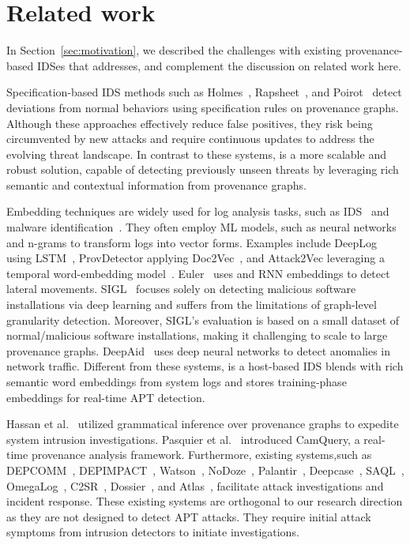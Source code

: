 \section{Related work}
\label{s:relwk}
In Section~\ref{sec:motivation}, we described the challenges with existing provenance-based IDSes that \Sys addresses, and complement the discussion on related work here.

 Specification-based IDS methods such as Holmes~\cite{holmes2019}, Rapsheet~\cite{rapsheet2020}, and Poirot~\cite{poirot2019} detect deviations from normal behaviors using specification rules on provenance graphs. Although these approaches effectively reduce false positives, they risk being circumvented by new attacks and require continuous updates to address the evolving threat landscape. In contrast to these systems, \Sys is a more scalable and robust solution, capable of detecting previously unseen threats by leveraging rich semantic and contextual information from provenance graphs.

 Embedding techniques are widely used for log analysis tasks, such as IDS~\cite{aljawarneh2018anomaly, maseer2021benchmarking, gyanchandani2012taxonomy,atlas} and malware identification~\cite{zolkipli2011approach, chakkaravarthy2019survey, isohara2011kernel}. They often employ ML models, such as neural networks and n-grams to transform logs into vector forms. Examples include DeepLog using LSTM~\cite{deeplog2017}, ProvDetector applying Doc2Vec~\cite{provdetector2020, le2014distributed}, and Attack2Vec leveraging a temporal word-embedding model~\cite{shen2019attack2vec}. Euler~\cite{king2022euler} uses \gnnshort and RNN embeddings to detect lateral movements. SIGL~\cite{sigl} focuses solely on detecting malicious software installations via deep learning and suffers from the limitations of graph-level granularity detection. Moreover, SIGL's evaluation is based on a small dataset of normal/malicious software installations, making it challenging to scale to large provenance graphs. DeepAid~\cite{deepaid} uses deep neural networks to detect anomalies in network traffic. Different from these systems, \Sys is a host-based IDS blends \gnnshort with rich semantic word embeddings from system logs and stores training-phase embeddings for real-time APT detection.

 Hassan et al.~\cite{winnower2018} utilized grammatical inference over provenance graphs to expedite system intrusion investigations. Pasquier et al.~\cite{pasquier2018runtime} introduced CamQuery, a real-time provenance analysis framework. Furthermore, existing systems,such as DEPCOMM~\cite{xu2022depcomm}, DEPIMPACT~\cite{fang2022back}, Watson~\cite{watson}, NoDoze~\cite{nodoze2019}, Palantir~\cite{zeng2022palantir}, Deepcase~\cite{van2022deepcase}, SAQL~\cite{217496}, OmegaLog~\cite{omegalog}, C2SR~\cite{kwon2021c}, Dossier~\cite{dossier}, and Atlas~\cite{atlas}, facilitate attack investigations and incident response. These existing systems are orthogonal to our research direction as they are not designed to detect APT attacks. They require initial attack symptoms from intrusion detectors to initiate investigations.

